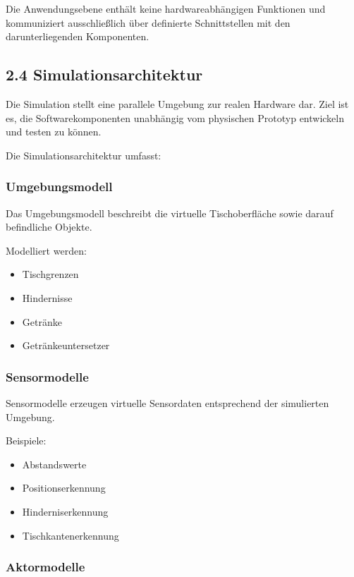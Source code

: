 \documentclass[
  a4paper,
  12pt,
  DIV=12,        %
  parskip=half,  %
  headings=small %
]{scrartcl}
\theoremstyle{definition}
\providecommand{\tightlist}{%
  \setlength{\itemsep}{0pt}\setlength{\parskip}{0pt}}
\theoremstyle{definition}
\providecommand{\tightlist}{%
  \setlength{\itemsep}{0pt}\setlength{\parskip}{0pt}}
\begin{document}
Die Anwendungsebene enthält keine hardwareabhängigen Funktionen und
kommuniziert ausschließlich über definierte Schnittstellen mit den
darunterliegenden Komponenten.

\subsection{2.4 Simulationsarchitektur}\label{simulationsarchitektur}

Die Simulation stellt eine parallele Umgebung zur realen Hardware dar.
Ziel ist es, die Softwarekomponenten unabhängig vom physischen Prototyp
entwickeln und testen zu können.

Die Simulationsarchitektur umfasst:

\subsubsection{Umgebungsmodell}\label{umgebungsmodell}

Das Umgebungsmodell beschreibt die virtuelle Tischoberfläche sowie
darauf befindliche Objekte.

Modelliert werden:

\begin{itemize}
\tightlist
\item
  Tischgrenzen
\item
  Hindernisse
\item
  Getränke
\item
  Getränkeuntersetzer
\end{itemize}

\subsubsection{Sensormodelle}\label{sensormodelle}

Sensormodelle erzeugen virtuelle Sensordaten entsprechend der
simulierten Umgebung.

Beispiele:

\begin{itemize}
\tightlist
\item
  Abstandswerte
\item
  Positionserkennung
\item
  Hinderniserkennung
\item
  Tischkantenerkennung
\end{itemize}

\subsubsection{Aktormodelle}\label{aktormodelle}
\end{document}
